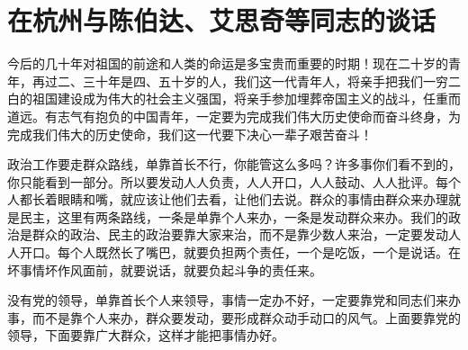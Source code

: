 \section[在杭州与陈伯达、艾思奇等同志的谈话（一九六五年十二月二十一日）]{在杭州与陈伯达、艾思奇等同志的谈话}


今后的几十年对祖国的前途和人类的命运是多宝贵而重要的时期！现在二十岁的青年，再过二、三十年是四、五十岁的人，我们这一代青年人，将亲手把我们一穷二白的祖国建设成为伟大的社会主义强国，将亲手参加埋葬帝国主义的战斗，任重而道远。有志气有抱负的中国青年，一定要为完成我们伟大历史使命而奋斗终身，为完成我们伟大的历史使命，我们这一代要下决心一辈子艰苦奋斗！

政治工作要走群众路线，单靠首长不行，你能管这么多吗？许多事你们看不到的，你只能看到一部分。所以要发动人人负责，人人开口，人人鼓动、人人批评。每个人都长着眼睛和嘴，就应该让他们去看，让他们去说。群众的事情由群众来办理就是民主，这里有两条路线，一条是单靠个人来办，一条是发动群众来办。我们的政治是群众的政治、民主的政治要靠大家来治，而不是靠少数人来治，一定要发动人人开口。每个人既然长了嘴巴，就要负担两个责任，一个是吃饭，一个是说话。在坏事情坏作风面前，就要说话，就要负起斗争的责任来。

没有党的领导，单靠首长个人来领导，事情一定办不好，一定要靠党和同志们来办事，而不是靠个人来办，群众要发动，要形成群众动手动口的风气。上面要靠党的领导，下面要靠广大群众，这样才能把事情办好。

